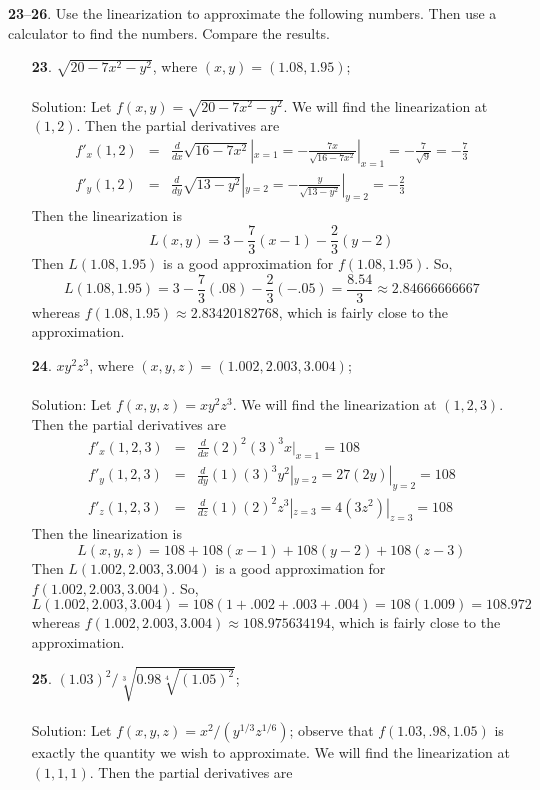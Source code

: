 \documentclass[12pt]{amsbook}
\begin{document}
\noindent
{\small {\bf 23}--{\bf 26}}. Use the linearization to approximate the following numbers. Then
use a calculator to find the numbers. Compare the results.
\begin{enumerate}
\item[{\small\bf 23}.] $\sqrt{20-7x^2-y^2}$, where $(x,y)=(1.08,1.95)$;
\\
\\
{\sc Solution}: Let $f(x,y)=\sqrt{20-7x^2-y^2}$. We will find the linearization at $(1,2)$. Then the partial derivatives are
\begin{eqnarray*}
f'_x(1,2)&=&\frac{d}{dx}\sqrt{16-7x^2}|_{x=1}=-\frac{7x}{\sqrt{16-7x^2}}|_{x=1}=-\frac{7}{\sqrt{9}}=-\frac{7}{3} \\
f'_y(1,2)&=&\frac{d}{dy}\sqrt{13-y^2}|_{y=2}=-\frac{y}{\sqrt{13-y^2}}|_{y=2}=-\frac{2}{3}
\end{eqnarray*}
Then the linearization is 
$$L(x,y)=3-\frac{7}{3}(x-1)-\frac{2}{3}(y-2)$$
Then $L(1.08,1.95)$ is a good approximation for $f(1.08,1.95)$. So,
$$L(1.08, 1.95)=3-\frac{7}{3}(.08)-\frac{2}{3}(-.05)=\frac{8.54}{3} \approx 2.84666666667$$
whereas $f(1.08,1.95) \approx 2.83420182768$, which is fairly close to the approximation.
\\
\item[{\small\bf 24}.] $xy^2z^3$, where $(x,y,z)=(1.002,2.003,3.004)$;
\\
\\
{\sc Solution}: Let $f(x,y,z)=xy^2z^3$. We will find the linearization at $(1,2,3)$. Then the partial derivatives are
\begin{eqnarray*}
f'_x(1,2,3)&=&\frac{d}{dx}(2)^2(3)^3x|_{x=1}=108 \\
f'_y(1,2,3)&=&\frac{d}{dy}(1)(3)^3y^2|_{y=2}=27(2y)|_{y=2}=108 \\
f'_z(1,2,3)&=&\frac{d}{dz}(1)(2)^2z^3|_{z=3}=4(3z^2)|_{z=3}=108
\end{eqnarray*}
Then the linearization is 
$$L(x,y,z)=108+108(x-1)+108(y-2)+108(z-3)$$
Then $L(1.002,2.003,3.004)$ is a good approximation for $f(1.002,2.003,3.004)$. So,
$$L(1.002,2.003,3.004)=108(1+.002+.003+.004)=108(1.009)=108.972$$
whereas $f(1.002,2.003,3.004) \approx 108.975634194$, which is fairly close to the approximation.
\\
\item[{\small\bf 25}.] $(1.03)^2/\sqrt[3]{0.98\sqrt[4]{(1.05)^2}}$;
\\
\\
{\sc Solution}: Let $f(x,y,z)=x^2/(y^{1/3}z^{1/6})$; observe that $f(1.03,.98,1.05)$ is exactly the quantity we wish to approximate. We will find the linearization at $(1,1,1)$. Then the partial derivatives are

\end{enumerate}
\end{document}
